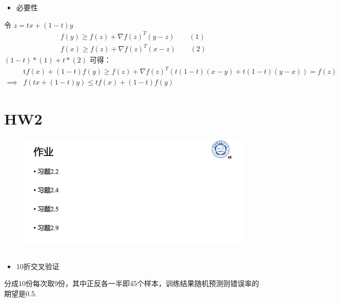 \documentclass[UTF8,a4paper,AutoFakeBold,AutoFakeSlant]{article}
\begin{document}
\begin{itemize}
  \item 必要性
\end{itemize}

令 $z=tx+(1-t)y$
\begin{equation*}
  \begin{aligned}
    f(y) \geq f(z)+\nabla f(z)^{T}(y-z) \qquad (1) \\
    f(x) \geq f(z)+\nabla f(z)^{T}(x-z) \qquad (2)
  \end{aligned}
\end{equation*}
$(1-t)*(1)+t*(2)$ 可得：
\begin{equation*}
  \begin{aligned}
             & \mathrm{t} f(x)+(1-t) f(y) \geq f(z)+\nabla f(z)^{T}(t(1-t)(x-y)+t(1-t)(y-x))  = f(z) \\
    \implies & f(t x+(1-t) y) \leq t f(x)+(1-t) f(y)
  \end{aligned}
\end{equation*}






\section{HW2}
\begin{figure}[htbp]
  \centering
  \includegraphics[scale=0.325]{hw2.png}
  \label{f3}
\end{figure}


\subsection{}
\begin{itemize}
  \item 10折交叉验证
\end{itemize}
分成10份每次取9份，其中正反各一半即45个样本，训练结果随机预测则错误率的期望是0.5.
\end{document}
